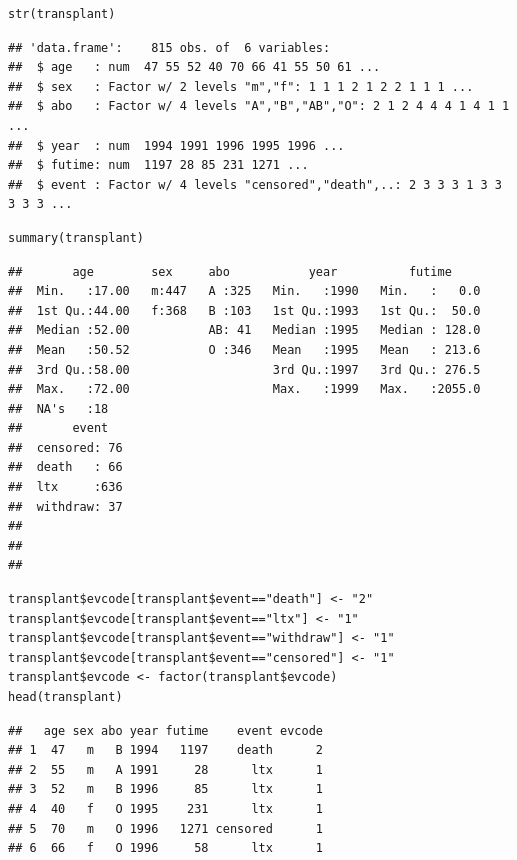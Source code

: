 \documentclass[
]{article}
\begin{document}
\begin{verbatim}
str(transplant)
\end{verbatim}

\begin{verbatim}
## 'data.frame':    815 obs. of  6 variables:
##  $ age   : num  47 55 52 40 70 66 41 55 50 61 ...
##  $ sex   : Factor w/ 2 levels "m","f": 1 1 1 2 1 2 2 1 1 1 ...
##  $ abo   : Factor w/ 4 levels "A","B","AB","O": 2 1 2 4 4 4 1 4 1 1 ...
##  $ year  : num  1994 1991 1996 1995 1996 ...
##  $ futime: num  1197 28 85 231 1271 ...
##  $ event : Factor w/ 4 levels "censored","death",..: 2 3 3 3 1 3 3 3 3 3 ...
\end{verbatim}

\begin{verbatim}
summary(transplant)
\end{verbatim}

\begin{verbatim}
##       age        sex     abo           year          futime      
##  Min.   :17.00   m:447   A :325   Min.   :1990   Min.   :   0.0  
##  1st Qu.:44.00   f:368   B :103   1st Qu.:1993   1st Qu.:  50.0  
##  Median :52.00           AB: 41   Median :1995   Median : 128.0  
##  Mean   :50.52           O :346   Mean   :1995   Mean   : 213.6  
##  3rd Qu.:58.00                    3rd Qu.:1997   3rd Qu.: 276.5  
##  Max.   :72.00                    Max.   :1999   Max.   :2055.0  
##  NA's   :18                                                      
##       event    
##  censored: 76  
##  death   : 66  
##  ltx     :636  
##  withdraw: 37  
##                
##                
## 
\end{verbatim}

\begin{verbatim}
transplant$evcode[transplant$event=="death"] <- "2"
transplant$evcode[transplant$event=="ltx"] <- "1"
transplant$evcode[transplant$event=="withdraw"] <- "1"
transplant$evcode[transplant$event=="censored"] <- "1"
transplant$evcode <- factor(transplant$evcode)
head(transplant)
\end{verbatim}

\begin{verbatim}
##   age sex abo year futime    event evcode
## 1  47   m   B 1994   1197    death      2
## 2  55   m   A 1991     28      ltx      1
## 3  52   m   B 1996     85      ltx      1
## 4  40   f   O 1995    231      ltx      1
## 5  70   m   O 1996   1271 censored      1
## 6  66   f   O 1996     58      ltx      1
\end{verbatim}
\end{document}
